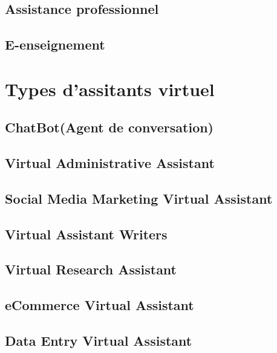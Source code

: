 \subsection{Assistance professionnel}
\paragraph{}

\subsection{E-enseignement}
\paragraph{}


\section{Types d'assitants virtuel}
\paragraph{}

\subsection{ChatBot(Agent de conversation)}
\label{chatbot}
\subsection{Virtual Administrative Assistant}
\subsection{Social Media Marketing Virtual Assistant}
\subsection{Virtual Assistant Writers}
\subsection{Virtual Research Assistant}
\subsection{eCommerce Virtual Assistant}
\subsection{Data Entry Virtual Assistant}

